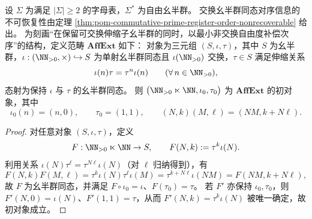 \begin{theorem}[交换外置的去序性与最小非交换补偿的初对象]\label{thm:conclusion-affine-ext-initial-object}
设 \(\Sigma\) 为满足 \(|\Sigma|\ge 2\) 的字母表，\(\Sigma^\ast\) 为自由幺半群。
交换幺半群同态对序信息的不可恢复性由定理 \ref{thm:pom-commutative-prime-register-order-nonrecoverable} 给出。
为刻画“在保留可交换伸缩子幺半群的同时，以最小非交换自由度补偿次序”的结构，定义范畴 \(\mathbf{AffExt}\) 如下：
对象为三元组 \((S,\iota,\tau)\)，其中 \(S\) 为幺半群，\(\iota:(\NN_{>0},\times)\hookrightarrow S\) 为单射幺半群同态且 \(\iota(\NN_{>0})\) 交换，\(\tau\in S\) 满足伸缩关系
\[
\iota(n)\tau=\tau^{n}\iota(n)\qquad(\forall\,n\in\NN_{>0}),
\]
态射为保持 \(\iota\) 与 \(\tau\) 的幺半群同态。
则 \(\bigl(\NN_{>0}\ltimes\NN,\iota_0,\tau_0\bigr)\) 为 \(\mathbf{AffExt}\) 的初对象，其中
\[
\iota_0(n)=(n,0),\qquad \tau_0=(1,1),
\qquad (N,k)(M,\ell)=(NM,k+N\ell).
\]
\end{theorem}
\begin{proof}
对任意对象 \((S,\iota,\tau)\)，定义
\[
F:\NN_{>0}\ltimes\NN\to S,\qquad F(N,k):=\tau^{k}\iota(N).
\]
利用关系 \(\iota(N)\tau^\ell=\tau^{N\ell}\iota(N)\)（对 \(\ell\) 归纳得到），有
\[
F(N,k)F(M,\ell)
=\tau^k\iota(N)\tau^\ell\iota(M)
=\tau^{k+N\ell}\iota(NM)
=F(NM,k+N\ell),
\]
故 \(F\) 为幺半群同态，并满足 \(F\circ\iota_0=\iota\)、\(F(\tau_0)=\tau\)。
若 \(F'\) 亦保持 \(\iota_0,\tau_0\)，则 \(F'(N,0)=\iota(N)\)、\(F'(1,1)=\tau\)，从而 \(F'(N,k)=\tau^k\iota(N)\) 被唯一确定，故初对象成立。
\end{proof}
